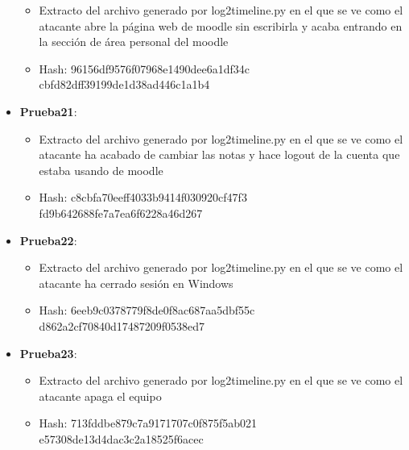 \begin{itemize}
{    \begin{itemize}
      \item{Extracto del archivo generado por log2timeline.py en el que se ve como el atacante abre la página web de moodle sin escribirla y acaba entrando en la sección de área personal del moodle}
      \item{Hash}: 96156df9576f07968e1490dee6a1df34c\\cbfd82dff39199de1d38ad446c1a1b4
    \end{itemize}}
  \item{\textbf{Prueba21}: 
    \begin{itemize}
      \item{Extracto del archivo generado por log2timeline.py en el que se ve como el atacante ha acabado de cambiar las notas y hace logout de la cuenta que estaba usando de moodle}
      \item{Hash}: c8cbfa70eeff4033b9414f030920cf47f3\\fd9b642688fe7a7ea6f6228a46d267
    \end{itemize}}
  \item{\textbf{Prueba22}: 
    \begin{itemize}
      \item{Extracto del archivo generado por log2timeline.py en el que se ve como el atacante ha cerrado sesión en Windows}
      \item{Hash}: 6eeb9c0378779f8de0f8ac687aa5dbf55c\\d862a2cf70840d17487209f0538ed7
    \end{itemize}}
  \item{\textbf{Prueba23}: 
    \begin{itemize}
      \item{Extracto del archivo generado por log2timeline.py en el que se ve como el atacante apaga el equipo}
      \item{Hash}: 713fddbe879c7a9171707c0f875f5ab021\\e57308de13d4dac3c2a18525f6acec
    \end{itemize}}

\end{itemize}
